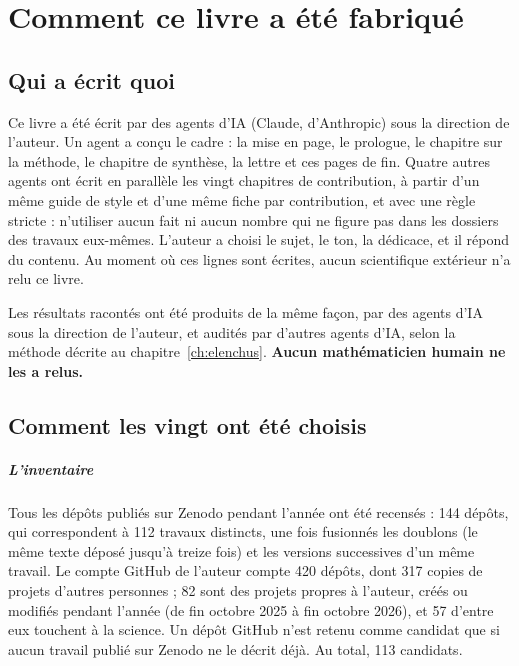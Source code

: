 \chapter{Comment ce livre a été fabriqué}

\section{Qui a écrit quoi}

Ce livre a été écrit par des agents d'IA (Claude, d'Anthropic) sous la direction de l'auteur. Un agent a conçu le
cadre : la mise en page, le prologue, le chapitre sur la méthode, le chapitre de synthèse, la lettre et ces pages de
fin. Quatre autres agents ont écrit en parallèle les vingt chapitres de contribution, à partir d'un même guide de
style et d'une même fiche par contribution, et avec une règle stricte : n'utiliser aucun fait ni aucun nombre qui ne
figure pas dans les dossiers des travaux eux-mêmes. L'auteur a choisi le sujet, le ton, la dédicace, et il répond du
contenu. Au moment où ces lignes sont écrites, aucun scientifique extérieur n'a relu ce livre.

Les résultats racontés ont été produits de la même façon, par des agents d'IA sous la direction de l'auteur, et
audités par d'autres agents d'IA, selon la méthode décrite au chapitre~\ref{ch:elenchus}. \textbf{Aucun mathématicien
humain ne les a relus.}

\section{Comment les vingt ont été choisis}

\paragraph{L'inventaire} Tous les dépôts publiés sur Zenodo pendant l'année ont été recensés : 144 dépôts, qui
correspondent à 112 travaux distincts, une fois fusionnés les doublons (le même texte déposé jusqu'à treize fois) et
les versions successives d'un même travail. Le compte GitHub de l'auteur compte 420 dépôts, dont 317 copies de
projets d'autres personnes ; 82 sont des projets propres à l'auteur, créés ou modifiés pendant l'année (de fin
octobre 2025 à fin octobre 2026), et 57 d'entre eux touchent à la science. Un dépôt GitHub n'est retenu comme candidat
que si aucun travail publié sur Zenodo ne le décrit déjà. Au total, 113 candidats.

